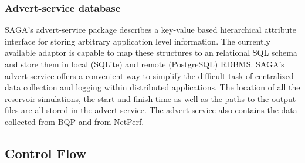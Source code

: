 \documentclass[conference,final]{IEEEtran}
\begin{document}

\subsubsection{Advert-service database} SAGA's advert-service package
describes a key-value based hierarchical attribute interface for
storing arbitrary application level information. The currently available adaptor is
capable to map these structures to an relational SQL schema and store
them in local (SQLite) and remote (PostgreSQL) RDBMS. SAGA's advert-service offers a convenient way to simplify the
difficult task of centralized data collection and logging within
distributed applications. The location of all the reservoir
simulations, the start and finish time as well as the paths to the
output files are all stored in the advert-service. The advert-service
also contains the data collected from BQP and from NetPerf.

\subsection{Control Flow}
\end{document}
